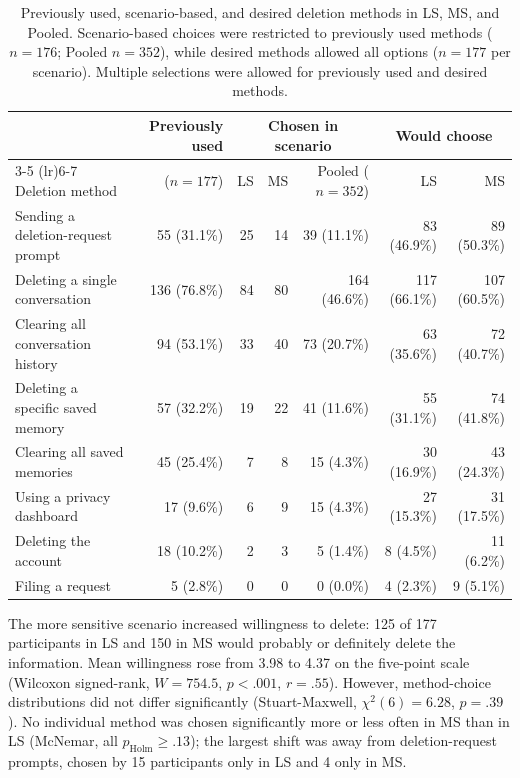     \begin{table}[!t]
    \centering
    \caption{Previously used, scenario-based, and desired deletion methods in LS, MS, and Pooled. Scenario-based choices were restricted to previously used methods ($n=176$; Pooled $n=352$), while desired methods allowed all options ($n=177$ per scenario). Multiple selections were allowed for previously used and desired methods.}
    \label{tab:method-use}
    \small
    \begin{tabular}{@{}lrrrrrr@{}}
    \toprule
    & Previously used & \multicolumn{3}{c}{Chosen in scenario} & \multicolumn{2}{c}{Would choose} \\
    \cmidrule(lr){3-5} \cmidrule(lr){6-7}
    Deletion method & ($n=177$) & LS & MS & Pooled ($n=352$) & LS & MS \\
    \midrule
    Sending a deletion-request prompt & 55 (31.1\%) & 25 & 14 & 39 (11.1\%) & 83 (46.9\%) & 89 (50.3\%) \\
    Deleting a single conversation & 136 (76.8\%) & 84 & 80 & 164 (46.6\%) & 117 (66.1\%) & 107 (60.5\%) \\
    Clearing all conversation history & 94 (53.1\%) & 33 & 40 & 73 (20.7\%) & 63 (35.6\%) & 72 (40.7\%) \\
    Deleting a specific saved memory & 57 (32.2\%) & 19 & 22 & 41 (11.6\%) & 55 (31.1\%) & 74 (41.8\%) \\
    Clearing all saved memories & 45 (25.4\%) & 7 & 8 & 15 (4.3\%) & 30 (16.9\%) & 43 (24.3\%) \\
    Using a privacy dashboard & 17 (9.6\%) & 6 & 9 & 15 (4.3\%) & 27 (15.3\%) & 31 (17.5\%) \\
    Deleting the account & 18 (10.2\%) & 2 & 3 & 5 (1.4\%) & 8 (4.5\%) & 11 (6.2\%) \\
    Filing a request & 5 (2.8\%) & 0 & 0 & 0 (0.0\%) & 4 (2.3\%) & 9 (5.1\%) \\
    \bottomrule
    \end{tabular}
    \end{table}


    The more sensitive scenario increased willingness to delete: 125 of 177 participants in LS and 150 in MS would probably or definitely delete the information. Mean willingness rose from 3.98 to 4.37 on the five-point scale (Wilcoxon signed-rank, $W=754.5$, $p<.001$, $r=.55$).
    However, method-choice distributions did not differ significantly (Stuart-Maxwell, $\chi^2(6)=6.28$, $p=.39$).
    No individual method was chosen significantly more or less often in MS than in LS (McNemar, all $p_{\mathrm{Holm}}\geq.13$); the largest shift was away from deletion-request prompts, chosen by 15 participants only in LS and 4 only in MS.


